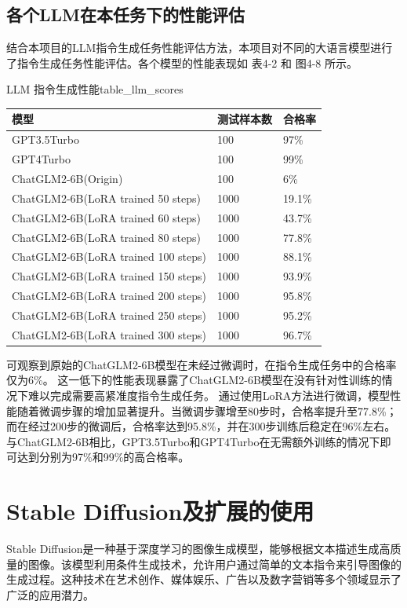 \documentclass[a4paper,AutoFakeBold,oneside,12pt]{book}
\begin{document}
\subsection{各个LLM在本任务下的性能评估}
结合本项目的LLM指令生成任务性能评估方法，本项目对不同的大语言模型进行了指令生成任务性能评估。各个模型的性能表现如 表4-2 和 图4-8 所示。
\begin{bupttable}{LLM 指令生成性能}{table_llm_scores}
    \begin{tabular}{|l|l|l|}
        \hline \textbf{模型} & \textbf{测试样本数} & \textbf{合格率} \\
        \hline GPT3.5Turbo & 100 & 97\% \\
        \hline GPT4Turbo & 100 & 99\% \\
        \hline ChatGLM2-6B(Origin) & 100 & 6\% \\
        \hline ChatGLM2-6B(LoRA trained 50 steps) & 1000 & 19.1\% \\
        \hline ChatGLM2-6B(LoRA trained 60 steps) & 1000 & 43.7\% \\
        \hline ChatGLM2-6B(LoRA trained 80 steps) & 1000 & 77.8\% \\
        \hline ChatGLM2-6B(LoRA trained 100 steps) & 1000 & 88.1\% \\
        \hline ChatGLM2-6B(LoRA trained 150 steps) & 1000 & 93.9\% \\
        \hline ChatGLM2-6B(LoRA trained 200 steps) & 1000 & 95.8\% \\
        \hline ChatGLM2-6B(LoRA trained 250 steps) & 1000 & 95.2\% \\
        \hline ChatGLM2-6B(LoRA trained 300 steps) & 1000 & 96.7\% \\
        \hline
    \end{tabular}
\end{bupttable}



可观察到原始的ChatGLM2-6B模型在未经过微调时，在指令生成任务中的合格率仅为6\%。
这一低下的性能表现暴露了ChatGLM2-6B模型在没有针对性训练的情况下难以完成需要高紧准度指令生成任务。
通过使用LoRA方法进行微调，模型性能随着微调步骤的增加显著提升。当微调步骤增至80步时，合格率提升至77.8\%；
而在经过200步的微调后，合格率达到95.8\%，并在300步训练后稳定在96\%左右。
与ChatGLM2-6B相比，GPT3.5Turbo和GPT4Turbo在无需额外训练的情况下即可达到分别为97\%和99\%的高合格率。

\section{Stable Diffusion及扩展的使用} %
Stable Diffusion是一种基于深度学习的图像生成模型，能够根据文本描述生成高质量的图像。该模型利用条件生成技术，允许用户通过简单的文本指令来引导图像的生成过程。这种技术在艺术创作、媒体娱乐、广告以及数字营销等多个领域显示了广泛的应用潜力。
\end{document}
